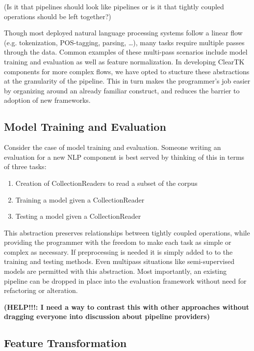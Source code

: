 \documentclass[10pt, a4paper]{article}
\begin{document}
(Is it that pipelines should look like pipelines or is it that tightly coupled operations should be left together?)

Though most deployed natural language processing systems follow a linear flow (e.g. tokenization, POS-tagging, parsing, \ldots), many tasks require multiple passes through the data.  Common examples of these multi-pass scenarios include model training and evaluation as well as feature normalization.  In developing ClearTK components for more complex flows, we have opted to stucture these abstractions at the granularity of the pipeline.  This in turn makes the programmer's job easier by organizing around an already familiar construct, and reduces the barrier to adoption of new frameworks.

\subsection{Model Training and Evaluation}
Consider the case of model training and evaluation.  Someone writing an evaluation for a new NLP component is best served by thinking of this in terms of three tasks:

\begin{enumerate}
\item Creation of CollectionReaders to read a subset of the corpus
\item Training a model given a CollectionReader
\item Testing a model given a CollectionReader
\end{enumerate}


This abstraction preserves relationships between tightly coupled operations, while providing the programmer with the freedom to make each task as simple or complex as necessary.  If preprocessing is needed it is simply added to to the training and testing methods.  Even multipass situations like semi-supervised models are permitted with this abstraction.  Most importantly, an existing pipeline can be dropped in place into the evaluation framework without need for refactoring or alteration.

\textbf{(HELP!!!: I need a way to contrast this with other approaches without dragging everyone into discussion about pipeline providers)}



\subsection{Feature Transformation}
\end{document}
